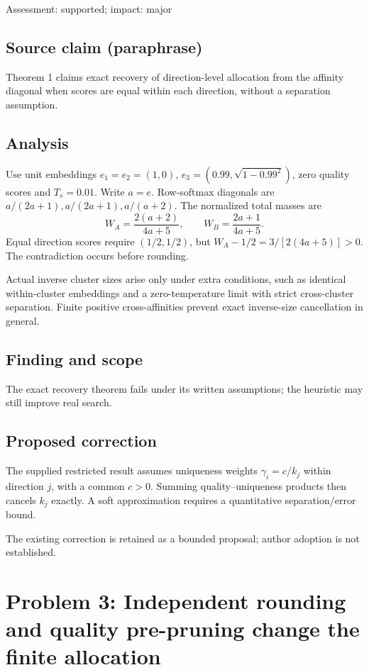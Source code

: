 \documentclass[11pt]{article}
\begin{document}
Assessment: supported; impact: major

\subsection*{Source claim (paraphrase)}

Theorem 1 claims exact recovery of direction-level allocation from the affinity diagonal when scores are equal within each direction, without a separation assumption.

\subsection*{Analysis}

Use unit embeddings \(e_1=e_2=(1,0)\), \(e_3=(0.99,\sqrt{1-0.99^2})\), zero quality scores and \(T_s=0.01\). Write \(a=e\). Row-softmax diagonals are \(a/(2a+1),a/(2a+1),a/(a+2)\). The normalized total masses are \[W_A=\frac{2(a+2)}{4a+5},\qquad W_B=\frac{2a+1}{4a+5}.\] Equal direction scores require \((1/2,1/2)\), but \(W_A-1/2=3/[2(4a+5)]>0\). The contradiction occurs before rounding.

Actual inverse cluster sizes arise only under extra conditions, such as identical within-cluster embeddings and a zero-temperature limit with strict cross-cluster separation. Finite positive cross-affinities prevent exact inverse-size cancellation in general.

\subsection*{Finding and scope}

The exact recovery theorem fails under its written assumptions; the heuristic may still improve real search.

\subsection*{Proposed correction}

The supplied restricted result assumes uniqueness weights \(\gamma_i=c/k_j\) within direction \(j\), with a common \(c>0\). Summing quality–uniqueness products then cancels \(k_j\) exactly. A soft approximation requires a quantitative separation/error bound.

The existing correction is retained as a bounded proposal; author adoption is not established.

\section*{Problem 3: Independent rounding and quality pre-pruning change the finite allocation}
\end{document}

